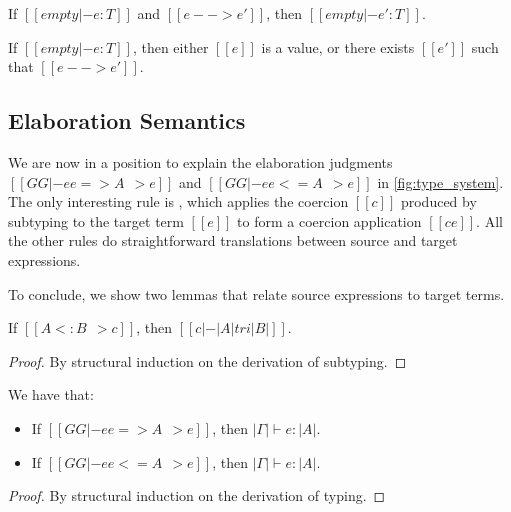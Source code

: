 \begin{theorem}[Preservation] \label{thm:target_preserve}
  If $[[empty |- e : T]]$ and $[[e --> e']]$, then $[[empty |- e' : T]]$.
\end{theorem}

\begin{theorem}[Progress] \label{thm:target_progress}
  If $[[empty |- e : T]]$, then either $[[e]]$ is a value, or there exists $[[e']]$ such
  that $[[e --> e']]$.
\end{theorem}


\subsection{Elaboration Semantics}


We are now in a position to explain the elaboration judgments $[[GG |- ee => A ~~> e]]$
and $[[GG |- ee <= A ~~> e]]$ in \cref{fig:type_system}. The only
interesting rule is , which applies the coercion $[[c]]$ produced by
subtyping to the target term $[[e]]$ to form a coercion application
$[[c e]]$. All the other rules do straightforward translations between
source and target expressions.


To conclude, we show two lemmas that relate source expressions to target terms.

\begin{lemma}   \label{lemma:sub-correct}
  If $[[A <: B ~~> c]]$, then $[[c |-  |A| tri |B|]]$.
\end{lemma}
\begin{proof}
  By structural induction on the derivation of subtyping.
\end{proof}


\begin{lemma} \label{thm:elab_safe}
  We have that:
  \begin{itemize}
  \item If $[[GG |- ee => A ~~> e]]$, then $|\Gamma| \vdash e : |A| $.
  \item If $[[GG |- ee <= A ~~> e]]$, then $|\Gamma| \vdash e : |A| $.
  \end{itemize}
\end{lemma}
\begin{proof}
  By structural induction on the derivation of typing.
\end{proof}

